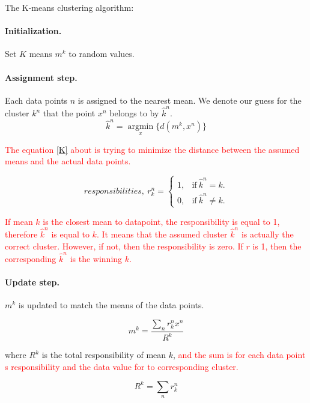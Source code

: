 \documentclass[11pt]{article}
\begin{document}
The K-means clustering algorithm:
\paragraph{Initialization.}
  Set $K$ means ${m^k}$ to random values.
\paragraph{Assignment step.}
 Each data points $n$ is assigned to the nearest mean. We denote our guess for the cluster $k^n$ that the point $x^n$ belongs to by $\hat{k}^n$.
  \begin{equation}
  \hat{k}^n = \operatorname*{argmin}_x \{d(m^k,x^n)\}
  \label{K}
  \end{equation}

  \textcolor{red}{The equation \ref{K} about is trying to minimize the distance between the assumed means and the actual data points.}

  \begin{equation}
    responsibilities,\ r^n_k=
    \begin{cases}
      1, & \text{if}\ \hat{k}^n = k. \\
      0, & \text{if}\ \hat{k}^n \neq k.
    \end{cases}
  \end{equation}

  \textcolor{red}{If mean $k$ is the closest mean to datapoint, the responsibility is equal to 1, therefore $\hat{k}^n$ is equal to $k$. It means that the assumed cluster $\hat{k}^n$ is actually the correct cluster. However, if not, then the responsibility is zero. If $r$ is 1, then the corresponding $\hat{k}^n$ is the winning ${k}$.}

\paragraph{Update step.}
  $m^k$ is updated to match the means of the data points.

  \begin{equation}
    m^k = \frac{\sum_n r^n_k x^n}{R^k}
  \label{update}
  \end{equation}

  where $R^k$ is the total responsibility of mean $k$, \textcolor{red}{and the sum is for each data point \textquotesingle s responsibility and the data value for to corresponding cluster.}

  \begin{equation}
    R^k = \sum_n r^n_k 
  \end{equation}
\end{document}
